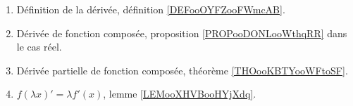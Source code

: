 
\begin{enumerate}
	\item
        Définition de la dérivée, définition \ref{DEFooOYFZooFWmcAB}. 
	\item
	      Dérivée de fonction composée, proposition \ref{PROPooDONLooWthqRR} dans le cas réel.
	\item
	      Dérivée partielle de fonction composée, théorème \ref{THOooKBTYooWFtoSF}.
	\item
	      \( f(\lambda x)'=\lambda f'(x)\), lemme \ref{LEMooXHVBooHYjXdq}.
\end{enumerate}

